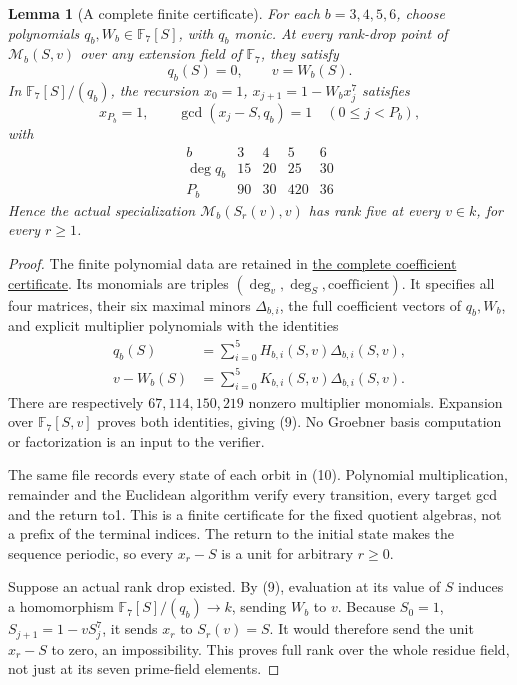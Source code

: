 \documentclass[11pt]{article}
\newtheorem{lemma}{Lemma}
\begin{document}
\begin{lemma}[A complete finite certificate]\label{lem:finite-certificate}
For each $b=3,4,5,6$, choose polynomials
$q_b,W_b\in\mathbb F_7[S]$, with $q_b$ monic.
At every rank-drop point of $\mathcal M_b(S,v)$ over any extension
field of $\mathbb F_7$, they satisfy
\[
                    q_b(S)=0,\qquad v=W_b(S).            \tag{9}
\]
In $\mathbb F_7[S]/(q_b)$, the recursion
$x_0=1$, $x_{j+1}=1-W_bx_j^7$ satisfies
\[
 x_{P_b}=1,\qquad \gcd(x_j-S,q_b)=1\quad(0\le j<P_b),      \tag{10}
\]
with
\[
\begin{array}{c|rrrr}
 b&3&4&5&6\\\hline
 \deg q_b&15&20&25&30\\
 P_b&90&30&420&36
\end{array}
\]
Hence the actual specialization $\mathcal M_b(S_r(v),v)$ has
rank five at every $v\in k$, for every $r\ge1$.
\end{lemma}
\begin{proof}
The finite polynomial data are retained in
\href{gap_six_scaled_power_plus_one_certificate.json}
{the complete coefficient certificate}.
Its monomials are triples $(\deg_v,\deg_S,\text{coefficient})$.
It specifies all four matrices, their six maximal minors
$\Delta_{b,i}$, the full coefficient vectors of $q_b,W_b$,
and explicit multiplier polynomials with the identities
\[
\begin{aligned}
 q_b(S)&=\sum_{i=0}^5H_{b,i}(S,v)\Delta_{b,i}(S,v),\\
 v-W_b(S)&=\sum_{i=0}^5K_{b,i}(S,v)\Delta_{b,i}(S,v).
\end{aligned}                                                   \tag{11}
\]
There are respectively $67,114,150,219$ nonzero multiplier monomials.
Expansion over $\mathbb F_7[S,v]$ proves both identities, giving (9).
No Groebner basis computation or factorization is an input to the
verifier.

The same file records every state of each orbit in (10).
Polynomial multiplication, remainder and the Euclidean algorithm
verify every transition, every target gcd and the return to1.
This is a finite certificate for the fixed quotient algebras,
not a prefix of the terminal indices.
The return to the initial state makes the sequence periodic,
so every $x_r-S$ is a unit for arbitrary $r\ge0$.

Suppose an actual rank drop existed. By (9), evaluation at its
value of $S$ induces a homomorphism
$\mathbb F_7[S]/(q_b)\to k$, sending $W_b$ to $v$.
Because $S_0=1$, $S_{j+1}=1-vS_j^7$, it sends $x_r$ to
$S_r(v)=S$. It would therefore send the unit $x_r-S$ to zero,
an impossibility. This proves full rank over the whole residue field,
not just at its seven prime-field elements.
\end{proof}
\end{document}
